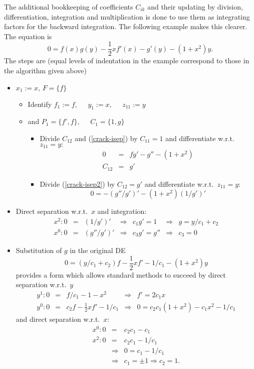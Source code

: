 The additional bookkeeping of coefficients $C_{ik}$ and their updating
by division, differentiation, integration and multiplication is done
to use them as integrating factors for the backward integration.  The
following example makes this clearer.  The equation is
\begin{equation}
0 = f(x) g(y) - \frac{1}{2}xf'(x) - g'(y) - (1+x^2)y. \label{crack-isep}
\end{equation}
The steps are (equal levels of indentation in the example correspond to
those in the algorithm given above)
\begin{itemize}
\item $x_1:=x, \, F=\{f\}$
  \begin{itemize}
  \item Identify $f_1:=f, \; \; \; \; \; y_1:=x, \; \; \; \; \; z_{11}:=y$
  \item and $P_1=\{f',f\}, \; \; \; \; \; C_1=\{1,g\}$
    \begin{itemize}
    \item Divide $C_{12}$ and
      (\ref{crack-isep}) by $C_{11}=1$ and differentiate w.r.t.\ $z_{11}=y:$
      \begin{eqnarray}
        0 & = & fg' - g'' - (1+x^2) \label{crack-isep2} \\
        C_{12} & = & g' \nonumber
      \end{eqnarray}
    \item Divide (\ref{crack-isep2}) by $C_{12}=g'$ and differentiate
      w.r.t.\ $z_{11}=y$:
      \[ 0 = - (g''/g')' - (1+x^2)(1/g')' \]
    \end{itemize}
  \end{itemize}
\item Direct separation w.r.t.\ $x$ and integration:
  \[ \begin{array}{rclclcl}
    x^2: 0 & = & (1/g')' & \Rightarrow & c_1g' =  1 & \Rightarrow &
    g = y/c_1 + c_2 \\
    x^0: 0 & = & (g''/g')' & \Rightarrow & c_3g' = g'' & \Rightarrow &
    c_3 = 0
  \end{array} \]
\item Substitution of $g$ in the original DE
  \[ 0 = (y/c_1+c_2)f - \frac{1}{2}xf' - 1/c_1 - (1+x^2)y \]
  provides a form which allows  standard methods to
  succeed by direct separation w.r.t.\ $y$
  \[ \begin{array}{rclcl}
    y^1: 0 & = & f/c_1 - 1 - x^2               & \Rightarrow & f'  =  2c_1x \\
    y^0: 0 & = & c_2f - \frac{1}{2}xf' - 1/c_1 & \Rightarrow & 0   =
    c_2c_1(1+x^2) - c_1x^2 - 1/c_1
  \end{array} \]
  and direct separation w.r.t.\ $x$:
  \begin{eqnarray*}
    x^0:  0 & = & c_2c_1 - c_1 \\
    x^2:  0 & = & c_2c_1 - 1/c_1 \\
    & \Rightarrow &  0 = c_1 - 1/c_1 \\
    & \Rightarrow & c_1 = \pm 1 \Rightarrow c_2 = 1.
  \end{eqnarray*}
\end{itemize}
